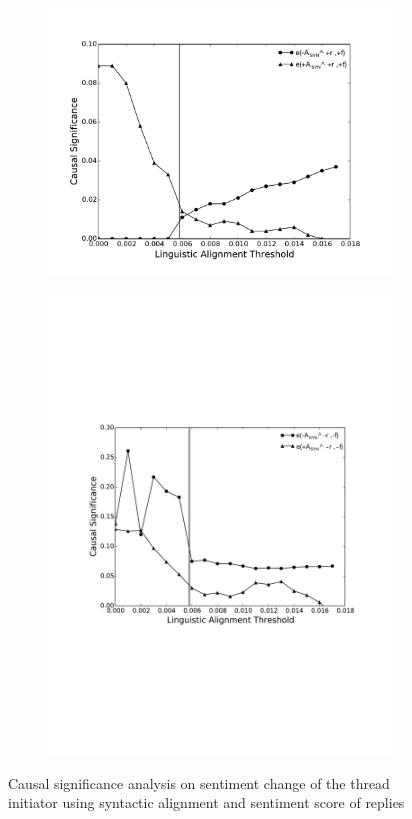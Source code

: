 \begin{figure}[!htb]
\begin{subfigure}{.5\textwidth}
  \centering
  \includegraphics[width=\linewidth]{Figures/posF05Syn20.pdf}
  \caption{\label{fig:posf05Syn}}
\end{subfigure}
\begin{subfigure}{.5\textwidth}
  \centering
  \includegraphics[width=\linewidth]{Figures/negF05Syn20.pdf}
  \caption{\label{fig:negf05Syn}}
\end{subfigure}
\caption{Causal significance analysis on sentiment change of the thread initiator using syntactic alignment and sentiment score of replies}
\label{fig:Robust_Syn}
\end{figure}

